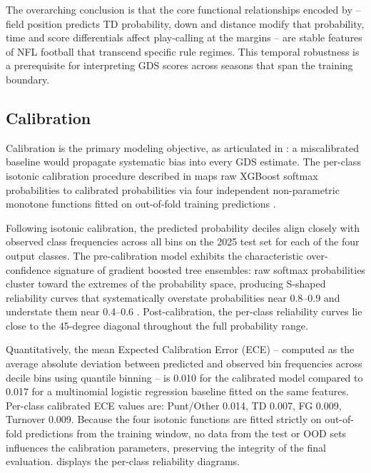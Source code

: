 The overarching conclusion is that the core functional relationships encoded
by \xscore{} -- field position predicts TD probability, down and distance
modify that probability, time and score differentials affect play-calling
at the margins -- are stable features of NFL football that transcend specific
rule regimes. This temporal robustness is a prerequisite for interpreting
GDS scores across seasons that span the training boundary.

\subsection{Calibration}
\label{sec:calibration-results}

Calibration is the primary modeling objective, as articulated in
: a miscalibrated baseline would propagate systematic
bias into every GDS estimate. The per-class isotonic calibration procedure
described in  maps raw XGBoost softmax probabilities
to calibrated probabilities via four independent non-parametric monotone
functions fitted on out-of-fold training predictions
\parencite{niculescumizil2005probabilities}.

Following isotonic calibration, the predicted probability deciles align
closely with observed class frequencies across all bins on the 2025 test set
for each of the four output classes. The pre-calibration model exhibits the
characteristic over-confidence signature of gradient boosted tree ensembles:
raw softmax probabilities cluster toward the extremes of the probability
space, producing S-shaped reliability curves that systematically overstate
probabilities near 0.8--0.9 and understate them near 0.4--0.6
\parencite{niculescumizil2005probabilities}. Post-calibration, the
per-class reliability curves lie close to the 45-degree diagonal throughout
the full probability range.

Quantitatively, the mean Expected Calibration Error (ECE) -- computed as the
average absolute deviation between predicted and observed bin frequencies
across decile bins using quantile binning -- is 0.010 for the calibrated model
compared to 0.017 for a multinomial logistic regression baseline fitted on the
same features. Per-class calibrated ECE values are: Punt/Other 0.014, TD
0.007, FG 0.009, Turnover 0.009. Because the four isotonic functions are
fitted strictly on out-of-fold predictions from the training window, no data
from the test or OOD sets influences the calibration parameters, preserving
the integrity of the final evaluation.  displays the per-class
reliability diagrams.

